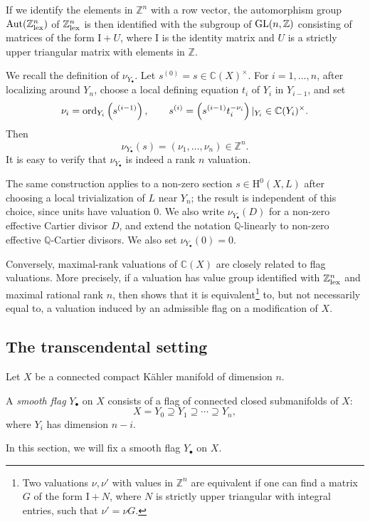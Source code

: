 If we identify the elements in $\mathbb{Z}^n$ with a row vector, the automorphism group $\operatorname{Aut}(\mathbb{Z}^n_{\mathrm{lex}})$ of $\mathbb{Z}^n_{\mathrm{lex}}$ is then identified with the subgroup of $\operatorname{GL}(n,\mathbb{Z})$ consisting of matrices of the form $\mathrm{I}+U$, where $\mathrm{I}$ is the identity matrix and $U$ is a strictly upper triangular matrix with elements in $\mathbb{Z}$.

We recall the definition of $\nu_{Y_\bullet}$. Let $s^{(0)}=s\in\mathbb C(X)^\times$. For $i=1,\ldots,n$, after localizing around $Y_n$, choose a local defining equation $t_i$ of $Y_i$ in $Y_{i-1}$, and set
\[
    \nu_i=\operatorname{ord}_{Y_i}\left(s^{(i-1)}\right),\qquad s^{(i)}=\left(s^{(i-1)}t_i^{-\nu_i}\right)|_{Y_i} \in \mathbb C(Y_i)^\times.
\]
Then
\[
    \nu_{Y_\bullet}(s)=(\nu_1,\ldots,\nu_n)\in\mathbb Z^n.
\]
It is easy to verify that $\nu_{Y_{\bullet}}$ is indeed a rank $n$ valuation.

The same construction applies to a non-zero section $s\in \mathrm H^0(X,L)$ after choosing a local trivialization of $L$ near $Y_n$; the result is independent of this choice, since units have valuation $0$. We also write $\nu_{Y_\bullet}(D)$ for a non-zero effective Cartier divisor $D$, and extend the notation $\mathbb Q$-linearly to non-zero effective $\mathbb Q$-Cartier divisors. We also set $\nu_{Y_{\bullet}}(0)=0$.

\begin{remark}\label{rmk:Abhyankar}
Conversely, maximal-rank valuations of $\mathbb C(X)$ are closely related to flag valuations. More precisely, if a valuation has value group identified with $\mathbb Z^n_{\mathrm{lex}}$ and maximal rational rank $n$, then \cite[Theorem~2.9]{CFKLRS17} shows that it is equivalent\footnote{Two valuations $\nu,\nu'$ with values in $\mathbb Z^n$ are equivalent if one can find a matrix $G$ of the form $\mathrm I+N$, where $N$ is strictly upper triangular with integral entries, such that $\nu'=\nu G$.} to, but not necessarily equal to, a valuation induced by an admissible flag on a modification of $X$.
\end{remark}

\subsection{The transcendental setting}
\label{subsec:flagval_trans}
Let $X$ be a connected compact Kähler manifold of dimension $n$.

\begin{definition}\label{def:Okounkov:L170}
    A \emph{smooth flag} $Y_{\bullet}$ on $X$ consists of a flag of connected closed submanifolds of $X$:
    \[
      X=Y_0\supseteq Y_1 \supseteq \cdots \supseteq Y_n,
    \]
    where $Y_i$ has dimension $n-i$.
\end{definition}
In this section, we will fix a smooth flag $Y_{\bullet}$ on $X$.



